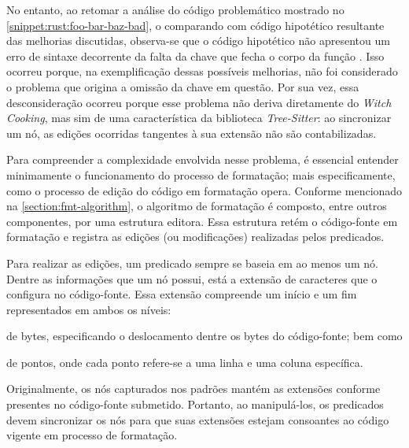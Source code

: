 \documentclass
  [11pt,a4paper,english,brazil,openright,sumario=tradicional,twoside]
  {abntex2}
\newcommand{\treesitter}{\textit{Tree-Sitter}\xspace}
\newcommand{\witchcooking}{\textit{Witch Cooking}\xspace}
\begin{document}
  No entanto, ao retomar a análise do código problemático mostrado no
  \cref{snippet:rust:foo-bar-baz-bad}, o comparando com código hipotético
  resultante das melhorias discutidas, observa-se que o código hipotético não
  apresentou um erro de sintaxe decorrente da falta da chave que fecha o corpo
  da função . Isso ocorreu porque, na exemplificação
  dessas possíveis melhorias, não foi considerado o problema que origina a
  omissão da chave em questão. Por sua vez, essa desconsideração ocorreu porque
  esse problema não deriva diretamente do \witchcooking, mas sim de uma
  característica da biblioteca \treesitter: ao sincronizar um nó, as edições
  ocorridas tangentes à sua extensão não são contabilizadas.

  Para compreender a complexidade envolvida nesse problema, é essencial
  entender minimamente o funcionamento do processo de formatação; mais
  especificamente, como o processo de edição do código em formatação opera.
  Conforme mencionado na \cref{section:fmt-algorithm}, o algoritmo de
  formatação é composto, entre outros componentes, por uma estrutura editora.
  Essa estrutura retém o código-fonte em formatação e registra as edições (ou
  modificações) realizadas pelos predicados.

  Para realizar as edições, um predicado sempre se baseia em ao menos um nó.
  Dentre as informações que um nó possui, está a extensão de caracteres que o
  configura no código-fonte. Essa extensão compreende um início e um fim
  representados em ambos os níveis:
  \begin{inparaenum}
    \item de bytes, especificando o deslocamento dentre os bytes do
          código-fonte; bem como
    \item de pontos, onde cada ponto refere-se a uma linha e uma coluna
          específica.
  \end{inparaenum}
  Originalmente, os nós capturados nos padrões mantém as extensões conforme
  presentes no código-fonte submetido. Portanto, ao manipulá-los, os
  predicados devem sincronizar os nós para que suas extensões estejam
  consoantes ao código vigente em processo de formatação.
\end{document}
